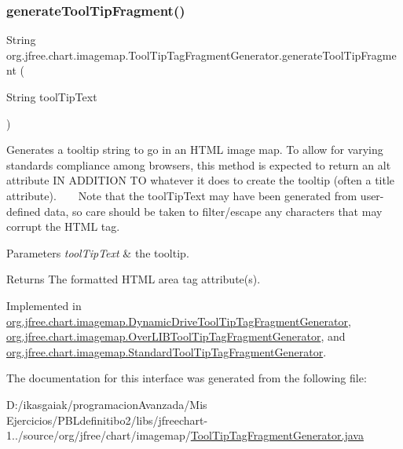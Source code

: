 \subsubsection{\texorpdfstring{generate\+Tool\+Tip\+Fragment()}{generateToolTipFragment()}}
{\footnotesize\ttfamily String org.\+jfree.\+chart.\+imagemap.\+Tool\+Tip\+Tag\+Fragment\+Generator.\+generate\+Tool\+Tip\+Fragment (\begin{DoxyParamCaption}\item[{String}]{tool\+Tip\+Text }\end{DoxyParamCaption})}

Generates a tooltip string to go in an H\+T\+ML image map. To allow for varying standards compliance among browsers, this method is expected to return an \textquotesingle{}alt\textquotesingle{} attribute IN A\+D\+D\+I\+T\+I\+ON TO whatever it does to create the tooltip (often a \textquotesingle{}title\textquotesingle{} attribute). ~\newline
~\newline
 Note that the {\ttfamily tool\+Tip\+Text} may have been generated from user-\/defined data, so care should be taken to filter/escape any characters that may corrupt the H\+T\+ML tag.


\begin{DoxyParams}{Parameters}
{\em tool\+Tip\+Text} & the tooltip.\\
\hline
\end{DoxyParams}
\begin{DoxyReturn}{Returns}
The formatted H\+T\+ML area tag attribute(s). 
\end{DoxyReturn}


Implemented in \mbox{\hyperlink{classorg_1_1jfree_1_1chart_1_1imagemap_1_1_dynamic_drive_tool_tip_tag_fragment_generator_a5a943646164a635e6e7bb0c2960a3712}{org.\+jfree.\+chart.\+imagemap.\+Dynamic\+Drive\+Tool\+Tip\+Tag\+Fragment\+Generator}}, \mbox{\hyperlink{classorg_1_1jfree_1_1chart_1_1imagemap_1_1_over_l_i_b_tool_tip_tag_fragment_generator_a235eb74d643d63a99bd7dfb830a03426}{org.\+jfree.\+chart.\+imagemap.\+Over\+L\+I\+B\+Tool\+Tip\+Tag\+Fragment\+Generator}}, and \mbox{\hyperlink{classorg_1_1jfree_1_1chart_1_1imagemap_1_1_standard_tool_tip_tag_fragment_generator_a40fb616f58a4849953a399a320333f40}{org.\+jfree.\+chart.\+imagemap.\+Standard\+Tool\+Tip\+Tag\+Fragment\+Generator}}.



The documentation for this interface was generated from the following file\+:\begin{DoxyCompactItemize}
\item 
D\+:/ikasgaiak/programacion\+Avanzada/\+Mis Ejercicios/\+P\+B\+Ldefinitibo2/libs/jfreechart-\/1../source/org/jfree/chart/imagemap/\mbox{\hyperlink{_tool_tip_tag_fragment_generator_8java}{Tool\+Tip\+Tag\+Fragment\+Generator.\+java}}\end{DoxyCompactItemize}
